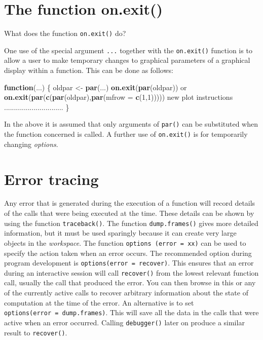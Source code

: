 \documentclass[
]{book}
\newenvironment{Shaded}{\begin{snugshade}}{\end{snugshade}}
\newcommand{\AttributeTok}[1]{\textcolor[rgb]{0.13,0.29,0.53}{#1}}
\newcommand{\ControlFlowTok}[1]{\textcolor[rgb]{0.13,0.29,0.53}{\textbf{#1}}}
\newcommand{\DecValTok}[1]{\textcolor[rgb]{0.00,0.00,0.81}{#1}}
\newcommand{\FunctionTok}[1]{\textcolor[rgb]{0.13,0.29,0.53}{\textbf{#1}}}
\newcommand{\NormalTok}[1]{#1}
\newcommand{\OtherTok}[1]{\textcolor[rgb]{0.56,0.35,0.01}{#1}}
\begin{document}
\section{The function on.exit()}\label{the-function-on.exit}

What does the function \texttt{on.exit()} do?

One use of the special argument \texttt{...} together with the \texttt{on.exit()} function is to allow a user to make temporary changes to graphical parameters of a graphical display within a function. This can be done as follows:

\begin{Shaded}
\begin{Highlighting}[]
\ControlFlowTok{function}\NormalTok{(...)}
\NormalTok{ \{ oldpar }\OtherTok{\textless{}{-}} \FunctionTok{par}\NormalTok{(...)}
   \FunctionTok{on.exit}\NormalTok{(}\FunctionTok{par}\NormalTok{(oldpar))  }
\NormalTok{   or }\FunctionTok{on.exit}\NormalTok{(}\FunctionTok{par}\NormalTok{(}\FunctionTok{c}\NormalTok{(}\FunctionTok{par}\NormalTok{(oldpar),}\FunctionTok{par}\NormalTok{(}\AttributeTok{mfrow =} \FunctionTok{c}\NormalTok{(}\DecValTok{1}\NormalTok{,}\DecValTok{1}\NormalTok{)))))}
\NormalTok{   new plot instructions}
\NormalTok{   ..............................}
\NormalTok{  \}}
\end{Highlighting}
\end{Shaded}

In the above it is assumed that only arguments of \texttt{par()} can be substituted when the function concerned is called. A further use of \texttt{on.exit()} is for temporarily changing \emph{{options}}.

\section{Error tracing}\label{error-tracing}

Any error that is generated during the execution of a function will record details of the calls that were being executed at the time. These details can be shown by using the function \texttt{traceback()}. The function \texttt{dump.frames()} gives more detailed information, but it must be used sparingly because it can create very large objects in the \emph{{workspace}}. The function \texttt{options\ (error\ =\ xx)} can be used to specify the action taken when an error occurs. The recommended option during program development is \texttt{options(error\ =\ recover)}. This ensures that an error during an interactive session will call \texttt{recover()} from the lowest relevant function call, usually the call that produced the error. You can then browse in this or any of the currently active calls to recover arbitrary information about the state of computation at the time of the error. An alternative is to set \texttt{options(error\ =\ dump.frames)}. This will save all the data in the calls that were active when an error occurred. Calling \texttt{debugger()} later on produce a similar result to \texttt{recover()}.
\end{document}

